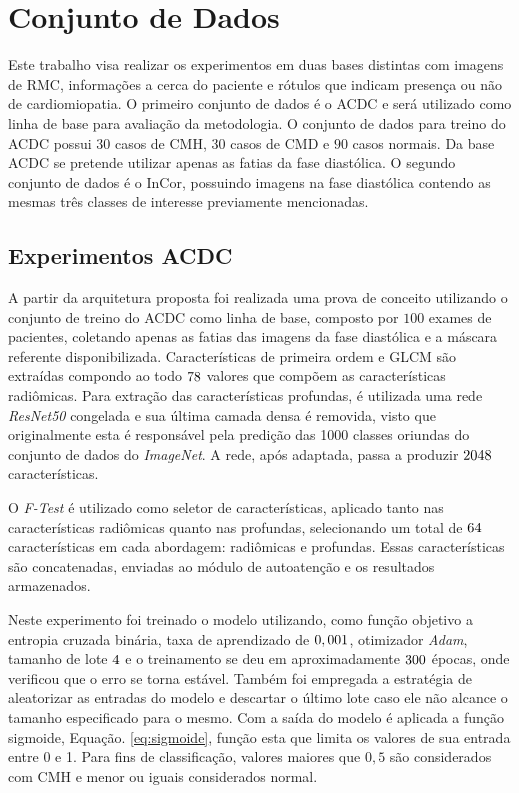 \section{Conjunto de Dados} 
\label{subsec:cap5_dataset}

Este trabalho visa realizar os experimentos em duas bases distintas com imagens de \gls{RMC}, informações a cerca do paciente e rótulos que indicam presença ou não de cardiomiopatia. O primeiro conjunto de dados é o \gls{ACDC} e será utilizado como linha de base para avaliação da metodologia. O conjunto de dados para treino do \gls{ACDC} possui $30$ casos de \gls{CMH}, $30$ casos de \gls{CMD} e $90$ casos normais. Da base \gls{ACDC} se pretende utilizar apenas as fatias da fase diastólica. O segundo conjunto de dados é o \gls{InCor}, possuindo imagens na fase diastólica contendo as mesmas três classes de interesse previamente mencionadas. 

\subsection{Experimentos ACDC}
\label{subsec:cap5_experimentos_acdc}

A partir da arquitetura proposta foi realizada uma prova de conceito utilizando o conjunto de treino do \gls{ACDC} como linha de base, composto por $100$ exames de pacientes, coletando apenas as fatias das imagens da fase diastólica e a máscara referente disponibilizada. Características de primeira ordem e \gls{GLCM} são extraídas compondo ao todo $78$ valores que compõem as características radiômicas. Para extração das características profundas, é utilizada uma rede \textit{ResNet50} congelada e sua última camada densa é removida, visto que originalmente esta é responsável pela predição das 1000 classes oriundas do conjunto de dados do \textit{ImageNet}. A rede, após adaptada, passa a produzir $2048$ características.

O \textit{F-Test} é utilizado como seletor de características, aplicado tanto nas características radiômicas quanto nas profundas, selecionando um total de $64$ características em cada abordagem: radiômicas e profundas. Essas características são concatenadas, enviadas ao módulo de autoatenção e os resultados armazenados.

Neste experimento foi treinado o modelo utilizando, como função objetivo a entropia cruzada binária, taxa de aprendizado de $0,001$, otimizador \textit{Adam}, tamanho de lote $4$ e o treinamento se deu em aproximadamente $300$ épocas, onde verificou que o erro se torna estável. Também foi empregada a estratégia de aleatorizar as entradas do modelo e descartar o último lote caso ele não alcance o tamanho especificado para o mesmo. Com a saída do modelo é aplicada a função sigmoide, Equação. \ref{eq:sigmoide}, função esta que limita os valores de sua entrada entre 0 e 1. Para fins de classificação, valores maiores que $0,5$ são considerados com \gls{CMH} e menor ou iguais considerados normal.

